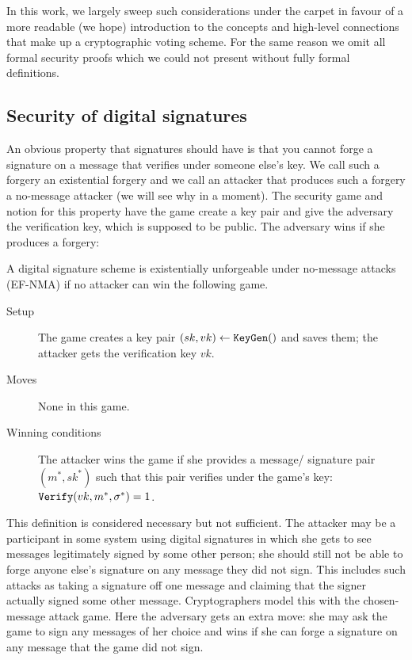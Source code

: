 \documentclass{llncs}
\newcommand{\alg}[1]{\textup{\texttt{#1}}}
\begin{document}

In this work, we largely sweep such considerations under the carpet in favour of
a more readable (we hope) introduction to the concepts and high-level
connections that make up a cryptographic voting scheme. For the same reason we
omit all formal security proofs which we could not present without fully formal
definitions.

\subsection{Security of digital signatures}

An obvious property that signatures should have is that you cannot forge a
signature on a message that verifies under someone else's key. We call such a
forgery an existential forgery and we call an attacker that produces such a
forgery a no-message attacker (we will see why in a moment). The security game
and notion for this property have the game create a key pair and give the
adversary the verification key, which is supposed to be public. The adversary
wins if she produces a forgery:

\begin{definition}
A digital signature scheme is existentially unforgeable under no-message attacks
(EF-NMA) if no attacker can win the following game.

    \begin{description}
    \item[Setup] The game creates a key pair $(sk, vk) \gets \alg{KeyGen}()$ and
                 saves them; the attacker gets the verification key $vk$.

    \item[Moves] None in this game.

    \item[Winning conditions] The attacker wins the game if she provides a
    message/ signature pair $(m^*, sk^*)$ such that this pair verifies under the
    game's key: $\alg{Verify}(vk, m^*, \sigma^*) = 1$.
    \end{description}
\end{definition}

This definition is considered necessary but not sufficient. The attacker may be
a participant in some system using digital signatures in which she gets to see
messages legitimately signed by some other person; she should still not be able
to forge anyone else's signature on any message they did not sign. This includes
such attacks as taking a signature off one message and claiming that the signer
actually signed some other message. Cryptographers model this with the chosen-
message attack game. Here the adversary gets an extra move: she may ask the game
to sign any messages of her choice and wins if she can forge a signature on any
message that the game did not sign.
\end{document}

